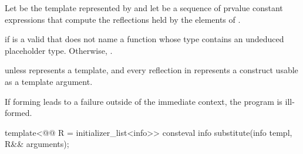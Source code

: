 \begin{itemdescr}
\pnum
Let  be the template represented by 
and let  be a sequence of prvalue constant expressions
that compute the reflections held by the elements of .

\pnum
\returns
{} if  is a valid 
that does not name a function
whose type contains an undeduced placeholder type.
Otherwise, .

\pnum
\throws
{} unless
 represents a template,
and every reflection in  represents a construct
usable as a template argument.

\pnum
\begin{note}
If forming  leads to a failure
outside of the immediate context,
the program is ill-formed.
\end{note}
\end{itemdescr}

%
\begin{itemdecl}
template<@@ R = initializer_list<info>>
  consteval info substitute(info templ, R&& arguments);
\end{itemdecl}


